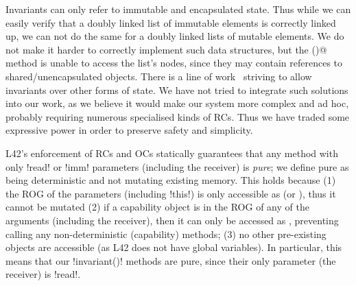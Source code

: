 Invariants can only refer to immutable and encapsulated state. Thus while we can easily verify that a doubly linked list of immutable elements
is correctly linked up,
we can not do the same for a doubly linked lists of mutable elements. We do not make it harder to correctly implement such data structures, 
but the \Q@invariant()@ method is unable to access the list's nodes, since they may contain \Q@mut@ references to shared/unencapsulated objects.
There is a line of work~\cite{DBLP:conf/mpc/BarnettN04} striving to allow invariants over other forms of state.
We have not tried to integrate such solutions into our work, as we believe it would make our system more complex and ad hoc, probably requiring numerous specialised kinds of RCs.
Thus we have traded some expressive power in order to preserve safety and simplicity.

\label{s:purity}
L42's enforcement of RCs and OCs statically guarantees that any method with only \Q!read! or \Q!imm! parameters (including the receiver) is \emph{pure}; we define pure
as being deterministic and not mutating existing memory. This holds because
(1) the ROG of the parameters (including \Q!this!) is only accessible as \Q@read@ (or \Q@imm@), thus it cannot be mutated
(2) if a capability object is in the ROG of any of the arguments (including the receiver), then it can only be accessed as \Q@read@, preventing calling any 
non-deterministic (capability) methods;
(3) no other pre-existing objects are accessible (as L42 does not have global variables). 
In particular, this means that our \Q!invariant()! methods are pure, since 
their only parameter (the receiver) is \Q!read!.

